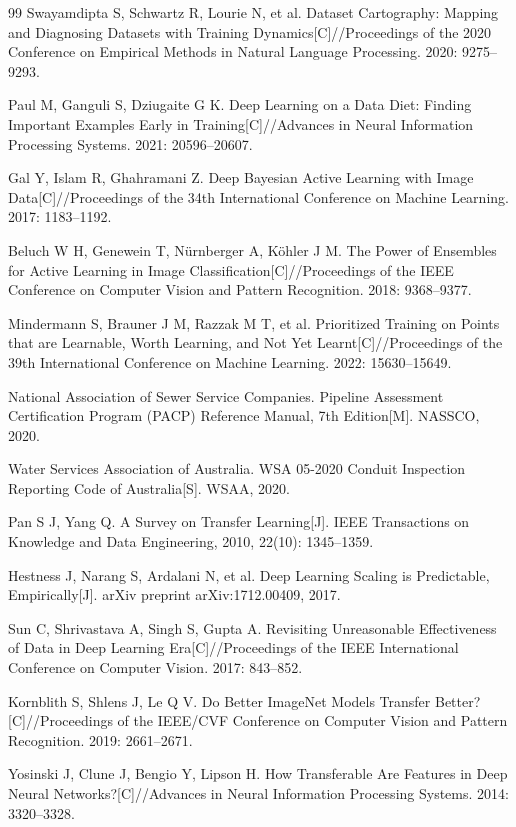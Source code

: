 \documentclass[UTF8,openany,12pt]{ctexbook}
\begin{document}
\begin{thebibliography}{99}
Swayamdipta S, Schwartz R, Lourie N, et al. Dataset Cartography: Mapping and Diagnosing Datasets with Training Dynamics[C]//Proceedings of the 2020 Conference on Empirical Methods in Natural Language Processing. 2020: 9275--9293.

Paul M, Ganguli S, Dziugaite G K. Deep Learning on a Data Diet: Finding Important Examples Early in Training[C]//Advances in Neural Information Processing Systems. 2021: 20596--20607.

Gal Y, Islam R, Ghahramani Z. Deep Bayesian Active Learning with Image Data[C]//Proceedings of the 34th International Conference on Machine Learning. 2017: 1183--1192.

Beluch W H, Genewein T, Nürnberger A, Köhler J M. The Power of Ensembles for Active Learning in Image Classification[C]//Proceedings of the IEEE Conference on Computer Vision and Pattern Recognition. 2018: 9368--9377.

Mindermann S, Brauner J M, Razzak M T, et al. Prioritized Training on Points that are Learnable, Worth Learning, and Not Yet Learnt[C]//Proceedings of the 39th International Conference on Machine Learning. 2022: 15630--15649.

National Association of Sewer Service Companies. Pipeline Assessment Certification Program (PACP) Reference Manual, 7th Edition[M]. NASSCO, 2020.

Water Services Association of Australia. WSA 05-2020 Conduit Inspection Reporting Code of Australia[S]. WSAA, 2020.

Pan S J, Yang Q. A Survey on Transfer Learning[J]. IEEE Transactions on Knowledge and Data Engineering, 2010, 22(10): 1345--1359.

Hestness J, Narang S, Ardalani N, et al. Deep Learning Scaling is Predictable, Empirically[J]. arXiv preprint arXiv:1712.00409, 2017.

Sun C, Shrivastava A, Singh S, Gupta A. Revisiting Unreasonable Effectiveness of Data in Deep Learning Era[C]//Proceedings of the IEEE International Conference on Computer Vision. 2017: 843--852.

Kornblith S, Shlens J, Le Q V. Do Better ImageNet Models Transfer Better?[C]//Proceedings of the IEEE/CVF Conference on Computer Vision and Pattern Recognition. 2019: 2661--2671.

Yosinski J, Clune J, Bengio Y, Lipson H. How Transferable Are Features in Deep Neural Networks?[C]//Advances in Neural Information Processing Systems. 2014: 3320--3328.

\end{thebibliography}
\end{document}
